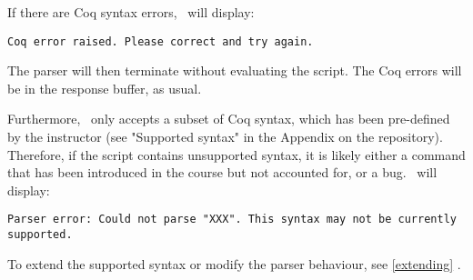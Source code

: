 If there are Coq syntax errors, \ will display:
\begin{verbatim}
Coq error raised. Please correct and try again.
\end{verbatim}
The parser will then terminate without evaluating the script. The Coq errors will be in the response buffer, as usual.

Furthermore, \ only accepts a subset of Coq syntax, which has been pre-defined by the instructor (see "Supported syntax" in the Appendix on the repository). Therefore, if the script contains unsupported syntax, it is likely either a command that has been introduced in the course but not accounted for, or a bug. \ will display:
\begin{verbatim}
Parser error: Could not parse "XXX". This syntax may not be currently supported.
\end{verbatim}

To extend the supported syntax or modify the parser behaviour, see \ref{extending} .